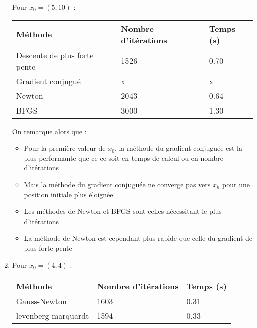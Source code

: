 \documentclass[12pt,a4paper,titlepage]{article}
\begin{document}
\begin{enumerate}
{            Pour $x_0 = (5,10)$ :

            \begin{table}[H]
                \begin{tabularx}{\textwidth}{ |l|X|X| }
                    \hline
                    Méthode & Nombre d'itérations & Temps (s) \\
                    \hline
                    Descente de plus forte pente & 1526 & 0.70 \\
                    \hline
                    Gradient conjugué & x & x \\
                    \hline
                    Newton & 2043 & 0.64 \\
                    \hline
                    BFGS & 3000 & 1.30 \\
                    \hline
                \end{tabularx}
            \end{table}

            On remarque alors que :

            \begin{itemize}
                \item{Pour la première valeur de $x_0$, la méthode du gradient conjuguée est la
                    plus performante que ce ce soit en temps de calcul ou en nombre d'itérations}
                \item{Mais la méthode du gradient conjuguée ne converge pas vers $x_h$ pour une
                    position initiale plus éloignée.}
                \item{Les méthodes de Newton et BFGS sont celles nécessitant le plus d'itérations}
                \item{La méthode de Newton est cependant plus rapide que celle du gradient de plus
                    forte pente}
            \end{itemize}

        }

        \setcounter{enumi}{5}
    \item{
            Pour $x_0 = (4,4)$ :

            \begin{table}[H]
                \begin{tabularx}{\textwidth}{ |l|X|X| }
                    \hline
                    Méthode & Nombre d'itérations & Temps (s) \\
                    \hline
                    Gauss-Newton & 1603 & 0.31 \\
                    \hline
                    levenberg-marquardt & 1594 & 0.33 \\
                    \hline
                \end{tabularx}
            \end{table}

}
\end{enumerate}
\end{document}
